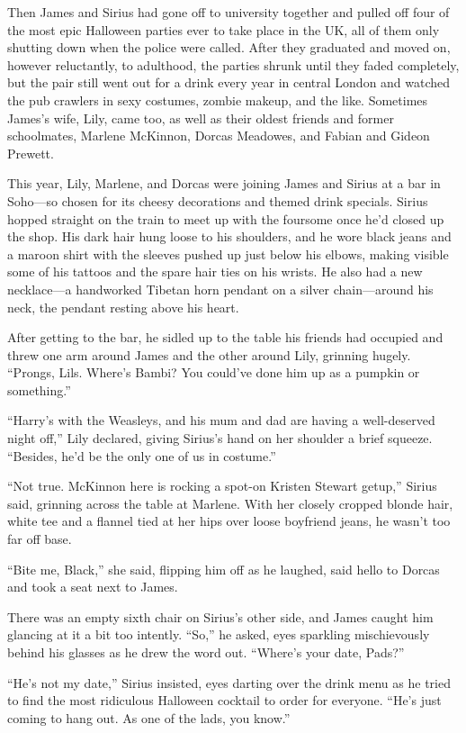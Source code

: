 Then James and Sirius had gone off to university together and pulled off four of the most epic Halloween parties ever to take place in the UK, all of them only shutting down when the police were called. After they graduated and moved on, however reluctantly, to adulthood, the parties shrunk until they faded completely, but the pair still went out for a drink every year in central London and watched the pub crawlers in sexy costumes, zombie makeup, and the like. Sometimes James’s wife, Lily, came too, as well as their oldest friends and former schoolmates, Marlene McKinnon, Dorcas Meadowes, and Fabian and Gideon Prewett.

This year, Lily, Marlene, and Dorcas were joining James and Sirius at a bar in Soho—so chosen for its cheesy decorations and themed drink specials. Sirius hopped straight on the train to meet up with the foursome once he’d closed up the shop. His dark hair hung loose to his shoulders, and he wore black jeans and a maroon shirt with the sleeves pushed up just below his elbows, making visible some of his tattoos and the spare hair ties on his wrists. He also had a new necklace—a handworked Tibetan horn pendant on a silver chain—around his neck, the pendant resting above his heart.

After getting to the bar, he sidled up to the table his friends had occupied and threw one arm around James and the other around Lily, grinning hugely. “Prongs, Lils. Where’s Bambi? You could’ve done him up as a pumpkin or something.”

“Harry’s with the Weasleys, and his mum and dad are having a well-deserved night off,” Lily declared, giving Sirius’s hand on her shoulder a brief squeeze. “Besides, he’d be the only one of us in costume.”

“Not true. McKinnon here is rocking a spot-on Kristen Stewart getup,” Sirius said, grinning across the table at Marlene. With her closely cropped blonde hair, white tee and a flannel tied at her hips over loose boyfriend jeans, he wasn’t too far off base.

“Bite me, Black,” she said, flipping him off as he laughed, said hello to Dorcas and took a seat next to James.

There was an empty sixth chair on Sirius’s other side, and James caught him glancing at it a bit too intently. “So,” he asked, eyes sparkling mischievously behind his glasses as he drew the word out. “Where’s your date, Pads?”

“He’s not my date,” Sirius insisted, eyes darting over the drink menu as he tried to find the most ridiculous Halloween cocktail to order for everyone. “He’s just coming to hang out. As one of the lads, you know.”


